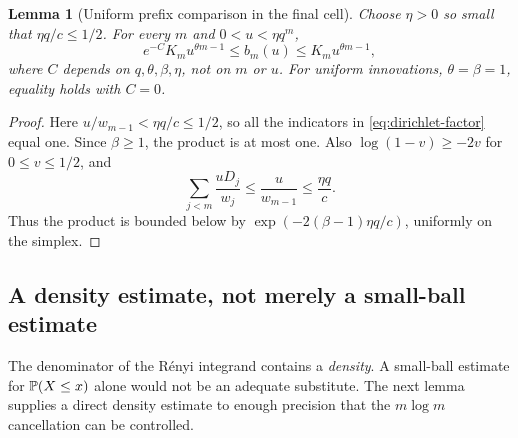 \documentclass[11pt,a4paper]{article}
\numberwithin{equation}{section}
\newtheorem{lemma}[lemma]{Lemma}
\theoremstyle{definition}\newaliascnt{definition}{theorem}
\theoremstyle{remark}\newaliascnt{remark}{theorem}
\begin{document}
\begin{lemma}[Uniform prefix comparison in the final cell]
\label{lem:prefix}
Choose $\eta>0$ so small that $\eta q/c\le1/2$. For every $m$ and
$0<u<\eta q^m$,
\begin{equation}
 e^{-C}K_m u^{\theta m-1}\le b_m(u)\le K_m u^{\theta m-1},
 \label{eq:prefix-bounds}
\end{equation}
where $C$ depends on $q,\theta,\beta,\eta$, not on $m$ or $u$.
For uniform innovations, $\theta=\beta=1$, equality holds with $C=0$.
\end{lemma}
\begin{proof}
Here $u/w_{m-1}<\eta q/c\le1/2$, so all the indicators in
\eqref{eq:dirichlet-factor} equal one. Since $\beta\ge1$, the product is at
most one. Also $\log(1-v)\ge-2v$ for $0\le v\le1/2$, and
\[
 \sum_{j<m}\frac{uD_j}{w_j}\le\frac{u}{w_{m-1}}
                                  \le\frac{\eta q}{c}.
\]
Thus the product is bounded below by
$\exp(-2(\beta-1)\eta q/c)$, uniformly on the simplex.
\end{proof}

\subsection{A density estimate, not merely a small-ball estimate}
The denominator of the R\'enyi integrand contains a \emph{density}. A
small-ball estimate for $\mathbb P(X\le x)$ alone would not be an adequate
substitute. The next lemma supplies a direct density estimate to enough
precision that the $m\log m$ cancellation can be controlled.
\end{document}
